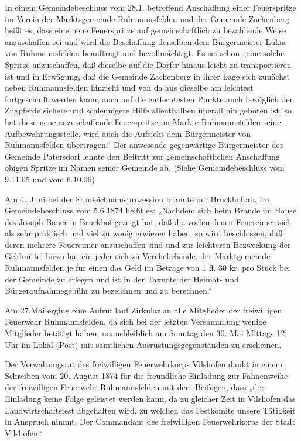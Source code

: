 \documentclass[12pt,a4pager]{book}
\begin{document}
In einem Gemeindebeschluss vom 28.1. betreffend Anschaffung einer Feuerspritze
im Verein der Marktsgemeinde Ruhmannsfelden und der Gemeinde Zachenberg heißt
es, dass eine neue Feuerspritze auf gemeinschaftlich zu bezahlende Weise
anzuschaffen sei und wird die Beschaffung derselben dem Bürgermeister Lukas von
Ruhmannsfelden beauftragt und bevollmächtigt. Es sei schon „eine solche Spritze
anzuschaffen, daß dieselbe auf die Dörfer hinaus leicht zu transportieren ist
und in Erwägung, daß die Gemeinde Zachenberg in ihrer Lage sich zunächst neben
Ruhmannsfelden hinzieht und von da aus dieselbe am leichtest fortgeschafft
werden kann, auch auf die entferntesten Punkte auch bezüglich der Zugpferde
sichere und schleunigere Hilfe allenthalben überall hin geboten ist, so hat
diese neue anzuschaffende Feuerspritze im Markte Ruhmannsfelden seine
Aufbewahrungsstelle, wird auch die Aufsicht dem Bürgermeister von Ruhmannsfelden
übertragen.“ Der anwesende gegenwärtige Bürgermeister der Gemeinde Patersdorf
lehnte den Beitritt zur gemeinschaftlichen Anschaffung obigen Spritze im Namen
seiner Gemeinde ab. (Siehe Gemeindebeschluss vom 9.11.05 und vom 6.10.06)

Am 4. Juni bei der Fronleichnamsprozession brannte der Bruckhof ab. Im
Gemeindebeschluss vom 5.6.1874 heißt es: „Nachdem sich beim Brande im Hause des
Joseph Bauer in Bruckhof gezeigt hat, daß die vorhandenen Feuereimer sich als
sehr praktisch und viel zu wenig erwiesen haben, so wird beschlossen, daß deren
mehrere Feuereimer anzuschaffen sind und zur leichteren Bezweckung der
Geldmittel hiezu hat ein jeder sich zu Verehelichende, der Marktgemeinde
Ruhmannsfelden je für einen das Geld im Betrage von 1 fl. 30 kr. pro Stück bei
der Gemeinde zu erlegen und ist in der Taxnote der Heimat- und
Bürgeraufnahmegebühr zu bezeichnen und zu berechnen.“

Am 27.Mai erging eine Aufruf lauf Zirkular an alle Mitglieder der freiwilligen
Feuerwehr Ruhmannsfelden, da sich bei der letzten Versammlung wenige Mitglieder
betätigt haben, unausbleiblich am Sonntag den 30. Mai Mittags 12 Uhr im Lokal
(Post) mit sämtlichen Ausrüstungsgegenständen zu erscheinen.

Der Verwaltungsrat des freiwilligen Feuerwehrkorps Vilshofen dankt in einem
Schreiben vom 20. August 1874 für die freundliche Einladung zur Fahnenweihe der
freiwilligen Feuerwehr Ruhmannsfelden mit dem Beifügen, dass „der Einladung
keine Folge geleistet werden kann, da zu gleicher Zeit in Vilshofen das
Landwirtschaftsfest abgehalten wird, zu welchen das Festkomite unsere Tätigkeit
in Anspruch nimmt. Der Commandant des freiwilligen Feuerwehrkorps der Stadt
Vilshofen.“
\end{document}
